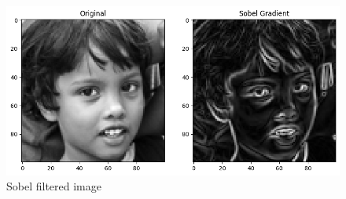 \begin{figure}[H]
    \centering
    \includegraphics[width=.9\textwidth]{imgs/sobel.png}
    \caption{Sobel filtered image}
    \label{fig:2_mediapipe}
\end{figure}